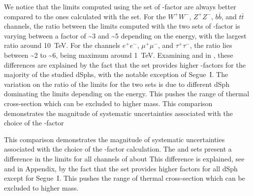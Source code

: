 We notice that the limits computed using the \B set of \J-factor are always better compared to the ones calculated with the \GS set.
For the $W^+W^-$, $Z^+Z^-$, $b\bar{b}$, and $t\bar{t}$ channels, the ratio between the limits computed with the two sets of \J-factor is varying between a factor of \textasciitilde3 and \textasciitilde5 depending on the energy, with the largest ratio around 10~TeV.
For the channels $e^+e^-$, $\mu^+\mu^-$, and $\tau^+\tau^-$, the ratio lies between \textasciitilde2 to \textasciitilde6, being maximum around 1~TeV.
Examining  and  in , these differences are explained by the fact that the \B set provides higher \J-factors for the majority of the studied dSphs, with the notable exception of Segue~I.
The variation on the ratio of the limits for the two sets is due to different dSph dominating the limits depending on the energy.
This pushes the range of thermal cross-section which can be excluded to higher mass.
This comparison demonstrates the magnitude of systematic uncertainties associated with the choice of the \J-factor

This comparison demonstrates the magnitude of systematic uncertainties associated with the choice of the \J-factor calculation.
The \GS and \B sets present a difference in the limits for all channels of about
This difference is explained, see   and  in Appendix, by the fact that the \B set provides higher \J factors for all dSph except for Segue~I. This pushes the range of thermal cross-section which can be excluded to higher mass.


